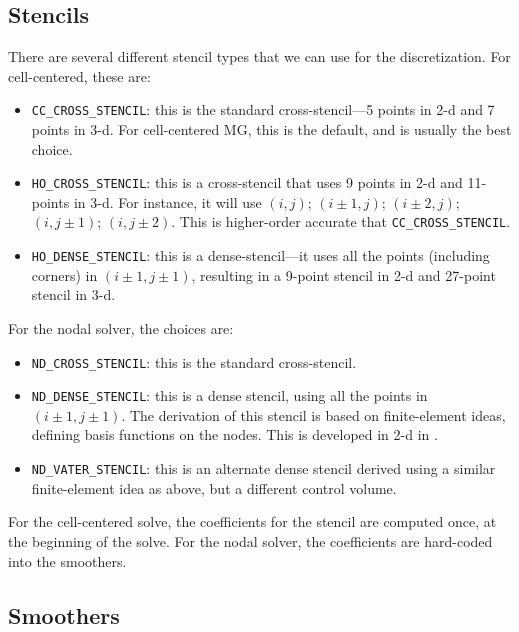 \subsection{Stencils}

There are several different stencil types that we can use for 
the discretization.  For cell-centered, these are:
\begin{itemize}
\item {\tt CC\_CROSS\_STENCIL}: this is the standard cross-stencil---5 points 
in 2-d and 7 points in 3-d.  For cell-centered MG, this is the default, and
is usually the best choice.

\item {\tt HO\_CROSS\_STENCIL}: this is a cross-stencil that uses 9 points
in 2-d and 11-points in 3-d.  For instance, it will use $(i,j)$;
$(i\pm1,j)$; $(i\pm2,j)$; $(i,j\pm1)$; $(i,j\pm2)$.  This is
higher-order accurate that {\tt CC\_CROSS\_STENCIL}.

\item {\tt HO\_DENSE\_STENCIL}: this is a dense-stencil---it uses all the
points (including corners) in $(i\pm1,j\pm1)$, resulting in a 9-point stencil
in 2-d and 27-point stencil in 3-d.
\end{itemize}

For the nodal solver, the choices are:
\begin{itemize}
\item {\tt ND\_CROSS\_STENCIL}: this is the standard cross-stencil.

\item {\tt ND\_DENSE\_STENCIL}: this is a dense stencil, using
  all the points in $(i\pm1,j\pm1)$.  The 
  derivation of this stencil is based on finite-element ideas, defining
  basis functions on the nodes.  This is developed in 2-d in 
  \cite{almgrenBellSzymczak:1996}.

\item {\tt ND\_VATER\_STENCIL}: this is an alternate dense stencil derived
  using a similar finite-element idea as above, but a different control
  volume.
\end{itemize}
For the cell-centered solve, the coefficients for the stencil are computed
once, at the beginning of the solve.  For the nodal solver, the coefficients
are hard-coded into the smoothers.

\subsection{Smoothers}

